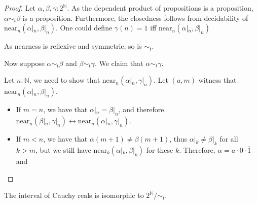 \begin{proof}
   Let $\alpha, \beta, \gamma : 2^\mathbb N$. 
   As the dependent product of propositions is a proposition, $\alpha \sim_t\beta$ is a proposition. 
   Furthermore, the closedness follows from decidability of $\text{near}_n(\alpha|_n, \beta|_n)$. 
   One could define $\gamma(n) = 1$ iff $\text{near}_n(\alpha|_n, \beta|_n)$
   
   As nearness is reflexive and symmetric, so is $\sim_t$. 

   Now suppose $\alpha \sim_t \beta$ and $\beta\sim_t \gamma$. 
   We claim that $\alpha \sim_t \gamma$. 

   Let $n:\mathbb N$, we need to show that 
   $\text{near}_n(\alpha|_n , \gamma|_n)$. 
   Let $(a,m)$ witness that $\text{near}_n(\alpha|_n, \beta|_n)$.
   \begin{itemize}
     \item 
   If $m=n$, we have that $\alpha|_n = \beta|_n$, and therefore 
   $\text{near}_n(\beta|_n, \gamma|_n) \leftrightarrow \text{near}_n(\alpha|_n, \gamma|_n)$.
   \item 
     If $m< n$, we have that $\alpha(m+1) \neq \beta(m+1)$, thus 
     $\alpha|_k \neq \beta|_k$ for all $k>m$, 
     but we still have $\text{near}_k(\alpha|_k, \beta|_k)$ for these $k$. 
     Therefore, $\alpha = a \cdot 0 \cdot \overline 1$ and 
  \end{itemize}
   



\end{proof}

\begin{proposition}
  The interval of Cauchy reals is isomorphic to $2^\mathbb N / \sim_t$. 
\end{proposition} 
